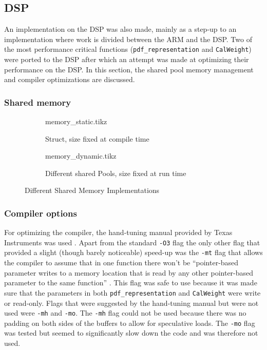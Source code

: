 \documentclass[final]{article}
\begin{document}
\subsection{DSP}
An implementation on the DSP was also made, mainly as a step-up to an implementation where work is divided between the ARM and the DSP.
Two of the most performance critical functions (\texttt{pdf\_representation} and \texttt{CalWeight}) were ported to the DSP after which an attempt was made at optimizing their performance on the DSP.
In this section, the shared pool memory management and compiler optimizations are discussed.

\subsubsection{Shared memory}

\begin{figure}[H]
    \centering
    \begin{subfigure}[b]{0.45\linewidth}
        \centering
        {memory_static.tikz}
        \caption{Struct, size fixed at compile time}
        \label{fig:memory-static}
    \end{subfigure}
    \begin{subfigure}[b]{0.45\linewidth}
        \centering
        {memory_dynamic.tikz}
        \caption{Different shared Pools, size fixed at run time}
        \label{fig:memory-dynamic}
    \end{subfigure}
    \caption{Different Shared Memory Implementations}
    \label{fig:memory}
\end{figure}


\subsubsection{Compiler options}
For optimizing the compiler, the hand-tuning manual provided by Texas Instruments was used \cite{handtuning}.
Apart from the standard \texttt{-O3} flag the only other flag that provided a slight (though barely noticeable) speed-up was the \texttt{-mt} flag that allows the compiler to assume that in one function there won't be ``pointer-based parameter writes to a memory location that is read by any other pointer-based parameter to the same function'' \cite{handtuning}.
This flag was safe to use because it was made sure that the parameters in both \texttt{pdf\_representation} and \texttt{CalWeight} were write or read-only.
Flags that were suggested by the hand-tuning manual but were not used were \texttt{-mh} and \texttt{-mo}.
The \texttt{-mh} flag could not be used because there was no padding on both sides of the buffers to allow for speculative loads.
The \texttt{-mo} flag was tested but seemed to significantly slow down the code and was therefore not used.
\end{document}
